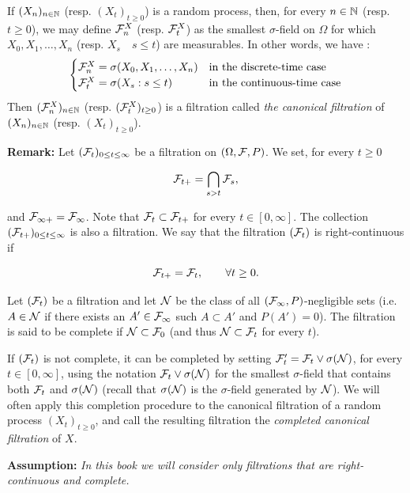 \documentclass[../Main.tex]{subfiles}
\begin{document}
If $(X_n)_{n \in \mathbb{N}}$ (resp. $(X_t)_{t \geq 0}$) is a random process, then, for every $n \in \mathbb{N}$ (resp. $t \geq 0$), we may define $\mathcal{F}_n^X$ (resp. $\mathcal{F}_t^X$) as the smallest $\sigma$-field on $\Omega$ for which $X_0, X_1, \ldots, X_n$ (resp. $X_s \quad s\leq t$) are measurables. In other words, we have :
\[
\begin{cases}
    \mathcal{F}_n^X = \sigma(X_0, X_1, \ldots, X_n) & \text{in the discrete-time case} \\
    \mathcal{F}_t^X = \sigma(X_s : s \leq t) & \text{in the continuous-time case}
\end{cases}
\]
Then $(\mathcal{F}_n^X)_{n \in \mathbb{N}}$ (resp. $(\mathcal{F}_t^X)_{t \geq 0}$) is a filtration called \textit{the canonical filtration} of $(X_n)_{n \in \mathbb{N}}$ (resp. $(X_t)_{t \geq 0}$).

\textbf{Remark:}
Let $(\mathcal{F}_t)_{0 \le t \le \infty}$ be a filtration on $(\Omega, \mathcal{F}, P)$. We set, for every $t \ge 0$

$$\mathcal{F}_{t+} = \bigcap_{s > t} \mathcal{F}_s,$$

and $\mathcal{F}_{\infty+} = \mathcal{F}_\infty$. Note that $\mathcal{F}_t \subset \mathcal{F}_{t+}$ for every $t \in [0, \infty]$. The collection $(\mathcal{F}_{t+})_{0 \le t \le \infty}$ is also a filtration. We say that the filtration $(\mathcal{F}_t)$ is right-continuous if

$$\mathcal{F}_{t+} = \mathcal{F}_t, \qquad \forall t \ge 0.$$

Let $(\mathcal{F}_t)$ be a filtration and let $\mathcal{N}$ be the class of all $(\mathcal{F}_\infty, P)$-negligible sets (i.e. $A \in \mathcal{N}$ if there exists an $A' \in \mathcal{F}_\infty$ such $A \subset A'$ and $P(A') = 0$). The filtration is said to be complete if $\mathcal{N} \subset \mathcal{F}_0$ (and thus $\mathcal{N} \subset \mathcal{F}_t$ for every $t$).

If $(\mathcal{F}_t)$ is not complete, it can be completed by setting $\mathcal{F}'_t = \mathcal{F}_t \vee \sigma(\mathcal{N})$, for every $t \in [0, \infty]$, using the notation $\mathcal{F}_t \vee \sigma(\mathcal{N})$ for the smallest $\sigma$-field that contains both $\mathcal{F}_t$ and $\sigma(\mathcal{N})$ (recall that $\sigma(\mathcal{N})$ is the $\sigma$-field generated by $\mathcal{N}$). We will often apply this completion procedure to the canonical filtration of a random process $(X_t)_{t \ge 0}$, and call the resulting filtration the \textit{completed canonical filtration} of $X$.

\textbf{Assumption:}
\textit{In this book we will consider only filtrations that are right-continuous and complete.}
\end{document}
